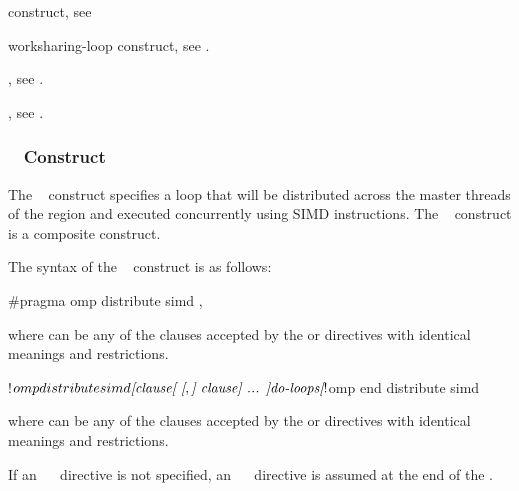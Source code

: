 \begin{crossrefs}
\item {} construct, see

\item worksharing-loop construct, see
.

\item {}, see .
\item {}, see
.
\end{crossrefs}



\subsubsection{~ Construct}
\label{subsec:distribute simd Construct}
\summary
The ~ construct specifies a loop that will be 
distributed across the master threads of the  region and executed 
concurrently using SIMD instructions. The ~ 
construct is a composite construct.

\syntax
The syntax of the ~ construct is as follows:

\begin{ccppspecific}
\begin{ompcPragma}
#pragma omp distribute simd \plc{[clause[ [},\plc{] clause] ... ] newline}
\end{ompcPragma}

where  can be any of the clauses accepted by the  
or  directives with identical meanings and restrictions.
\end{ccppspecific}

\begin{fortranspecific}
\begin{ompfPragma}
!$omp distribute simd \plc{[clause[ [},\plc{] clause] ... ]}
   \plc{do-loops}
\plc{[}!$omp end distribute simd\plc{]}
\end{ompfPragma}

where  can be any of the clauses accepted by the  
or  directives with identical meanings and restrictions.

If an ~~ directive is not specified, an 
~~ directive is assumed at the end of 
the .
\end{fortranspecific}

